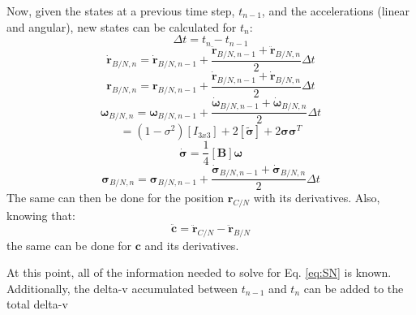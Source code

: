Now, given the states at a previous time step, $t_{n-1}$, and the accelerations (linear and angular), new states can be calculated for $t_n$:
\begin{equation}
	\Delta t = t_{n} - t_{n-1}
\end{equation}
\begin{equation}
\dot{\bm{r}}_{B/N,n} = \dot{\bm{r}}_{B/N,n-1} + \frac{\ddot{\bm{r}}_{B/N,n-1}+\ddot{\bm{r}}_{B/N,n}}{2} \Delta t
\end{equation}
\begin{equation}
	\bm{r}_{B/N,n} = \bm{r}_{B/N,n-1} + \frac{\dot{\bm{r}}_{B/N,n-1}+\dot{\bm{r}}_{B/N,n}}{2} \Delta t
\end{equation}
\begin{equation}
\bm{\omega}_{B/N,n} = \bm{\omega}_{B/N,n-1} + \frac{\dot{\bm{\omega}}_{B/N,n-1}+\dot{\bm{\omega}}_{B/N,n}}{2} \Delta t
\end{equation}
\begin{equation}
[\bm{B}] = (1-\sigma^2)[I_{3x3}]+2[\tilde{\bm{\sigma}}] + 2\bm{\sigma}\bm{\sigma}^T
\end{equation}
\begin{equation}
	\bm{\dot{\sigma}} = \frac{1}{4} [\bm{B}] \bm{\omega}
\end{equation}
\begin{equation}
\bm{\sigma}_{B/N,n} = \bm{\sigma}_{B/N,n-1} + \frac{\dot{\bm{\sigma}}_{B/N,n-1}+\dot{\bm{\sigma}}_{B/N,n}}{2} \Delta t
\end{equation}
The same can then be done for the position $ {\bm{r}}_{C/N}$ with its derivatives. Also, knowing that:
\begin{equation}
\ddot{\bm{c}} = \ddot{\bm{r}}_{C/N} - \ddot{\bm{r}}_{B/N}
\end{equation}
the same can be done for $\bm{c}$ and its derivatives. 

At this point, all of the information needed to solve for Eq. \ref{eq:SN} is known. Additionally, the delta-v accumulated between $t_{n-1}$ and $t_{n}$ can be added to the total delta-v

